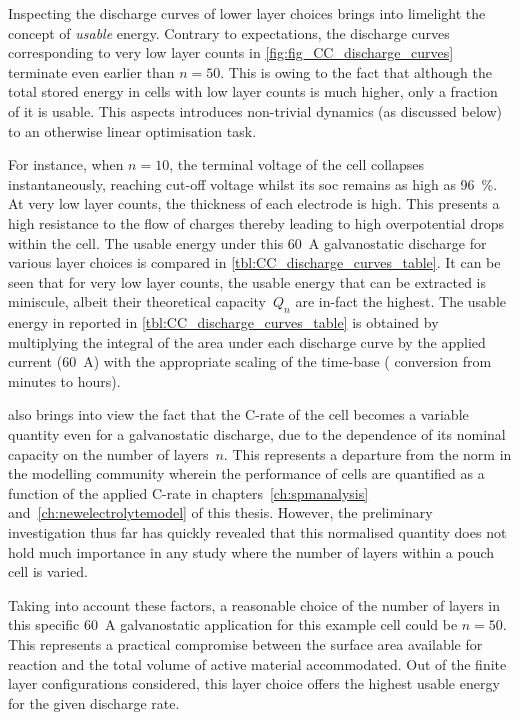 Inspecting the discharge curves of lower layer choices brings into limelight the
concept of \emph{usable} energy. Contrary  to expectations, the discharge curves
corresponding  to very  low layer  counts in  \cref{fig:fig_CC_discharge_curves}
terminate even earlier than $n=50$. This is  owing to the fact that although the
total  stored energy  in cells  with low  layer counts  is much  higher, only  a
fraction  of it  is usable.  This  aspects introduces  non-trivial dynamics  (as
discussed below) to an otherwise linear optimisation task.

For  instance,  when $n  =  10$,  the terminal  voltage  of  the cell  collapses
instantaneously, reaching cut-off  voltage whilst its \gls{soc}  remains as high
as \SI{96}{\percent}. At very low layer  counts, the thickness of each electrode
is high. This presents a high resistance  to the flow of charges thereby leading
to  high overpotential  drops  within the  cell. The  usable  energy under  this
\SI{60}{\ampere} galvanostatic  discharge for various layer  choices is compared
in \cref{tbl:CC_discharge_curves_table}. It can be  seen that for very low layer
counts,  the usable  energy that  can be  extracted is  miniscule, albeit  their
theoretical  capacity~$Q_n$  are  in-fact  the highest.  The  usable  energy  in
\SI{}{\watthour} reported in \cref{tbl:CC_discharge_curves_table} is obtained by
multiplying the integral  of the area under each discharge  curve by the applied
current (\SI{60}{\ampere}) with the appropriate scaling of the time-base ( \ie{}
conversion from minutes to hours).



  also brings  into view  the fact  that the
\mbox{C-rate} of the  cell becomes a variable quantity even  for a galvanostatic
discharge,  due to  the dependence  of  its nominal  capacity on  the number  of
layers~$n$. This represents a departure from the norm in the modelling community
wherein the  performance of cells  are quantified as  a function of  the applied
C-rate  \eg{} in  chapters~\ref{ch:spmanalysis} and~\ref{ch:newelectrolytemodel}
of  this thesis.  However, the  preliminary investigation  thus far  has quickly
revealed that  this normalised  quantity does  not hold  much importance  in any
study where the number of layers within a pouch cell is varied.

Taking into account  these factors, a reasonable choice of  the number of layers
in  this specific  \SI{60}{\ampere} galvanostatic  application for  this example
cell  could  be $n=50$.  This  represents  a  practical compromise  between  the
surface area  available for  reaction and  the total  volume of  active material
accommodated.  Out of  the finite  layer configurations  considered, this  layer
choice offers the highest usable energy for the given discharge rate.

